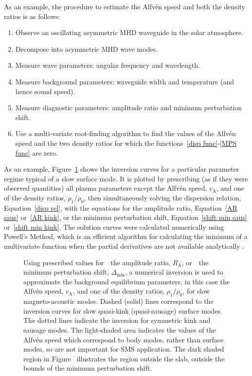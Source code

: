\documentclass[12pt]{../style-files/ociamthesis}
\newcommand{\figdir}{../main/figures/chpt-4/} %
\begin{document}
As an example, the procedure to estimate the Alfv\'{e}n speed and both the density ratios is as follows:
\begin{enumerate}
	\item Observe an oscillating asymmetric MHD waveguide in the solar atmosphere.
	\item Decompose into asymmetric MHD wave modes.
	\item Measure wave parameters: angular frequency and wavelength.
	\item Measure background parameters: waveguide width and temperature (and hence sound speed).
	\item Measure diagnostic parameters: amplitude ratio and minimum perturbation shift.
	\item Use a multi-variate root-finding algorithm to find the values of the Alfv\'{e}n speed and the two density ratios for which the functions~\eqref{disp func}-\eqref{MPS func} are zero.
\end{enumerate}

As an example, Figure~\ref{fig: vA approx} shows the inversion curves for a particular parameter regime typical of a slow surface mode. It is plotted by prescribing (as if they were observed quantities) all plasma parameters except the Alfv\'{e}n speed, $v_\textrm{A}$, and one of the density ratios, $\rho_1/\rho_0$, then simultaneously solving the dispersion relation, Equation~\eqref{disp rel}, with the equations for the amplitude ratio, Equation~\eqref{AR saus} or~\eqref{AR kink}, or the minimum perturbation shift, Equation~\eqref{shift min saus} or~\eqref{shift min kink}. The solution curves were calculated numerically using Powell's Method, which is an efficient algorithm for calculating the minimum of a multivariate function when the partial derivatives are not available analytically \citep{pow64}.

\begin{figure}
	\centering
	\caption{Using prescribed values for~\protect{}~the amplitude ratio, $R_\textrm{A}$, or~\protect{}~the minimum perturbation shift, $\Delta_\textrm{min}$, a numerical inversion is used to approximate the background equilibrium parameters, in this case the Alfv\'{e}n speed, $v_\textrm{A}$, and one of the density ratios, $\rho_1 / \rho_0$, for slow magneto-acoustic modes. Dashed (solid) lines correspond to the inversion curves for slow quasi-kink (quasi-sausage) surface modes. The dotted lines indicate the inversion for symmetric kink and sausage modes. The light-shaded area indicates the values of the Alfv\'{e}n speed which correspond to body modes, rather than surface modes, so are not important for SMS application. The dark shaded region in Figure~\protect{} illustrates the region outside the slab, outside the bounds of the minimum perturbation shift.}
	\label{fig: vA approx}
\end{figure}
\end{document}
